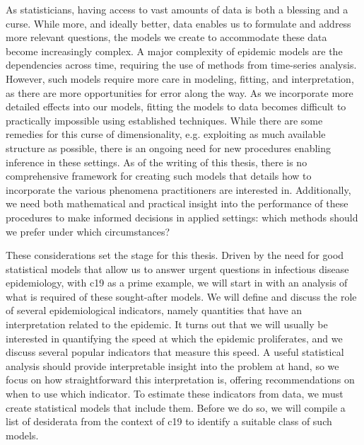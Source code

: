 As statisticians, having access to vast amounts of data is both a blessing and a curse. While more, and ideally better, data enables us to formulate and address more relevant questions, the models we create to accommodate these data become increasingly complex. A major complexity of epidemic models are the dependencies across time, requiring the use of methods from time-series analysis. However, such models require more care in modeling, fitting, and interpretation, as there are more opportunities for error along the way. As we incorporate more detailed effects into our models, fitting the models to data becomes difficult to practically impossible using established techniques. While there are some remedies for this curse of dimensionality, e.g. exploiting as much available structure as possible, there is an ongoing need for new procedures enabling inference in these settings. As of the writing of this thesis, there is no comprehensive framework for creating such models that details how to incorporate the various phenomena practitioners are interested in. Additionally, we need both mathematical and practical insight into the performance of these procedures to make informed decisions in applied settings: which methods should we prefer under which circumstances?

These considerations set the stage for this thesis. Driven by the need for good statistical models that allow us to answer urgent questions in infectious disease epidemiology, with \acrshort{c19} as a prime example, we will start in  with an analysis of what is required of these sought-after models. We will define and discuss the role of several epidemiological indicators, namely quantities that have an interpretation related to the epidemic. It turns out that we will usually be interested in quantifying the speed at which the epidemic proliferates, and we discuss several popular indicators that measure this speed. A useful statistical analysis should provide interpretable insight into the problem at hand, so we focus on how straightforward this interpretation is, offering recommendations on when to use which indicator. To estimate these indicators from data, we must create statistical models that include them. Before we do so, we will compile a list of desiderata from the context of \acrshort{c19} to identify a suitable class of such models. 

